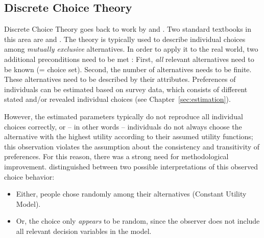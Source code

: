 \subsection{Discrete Choice Theory}
\label{ch:economicEval:describingBehavior:discreteChoice}
%
%

\label{ch:economicEval:describingBehavior:discreteChoice:foundations}
%


Discrete Choice Theory goes back to work by \citet{Luce1965PreferenceUtility} and \citet{McFadden1975DiscreteChoiceModel}. Two standard textbooks in this area are \citet{BenAkivaLerman_1985} and \citet{Train2003discreteChoiceBook}. The theory is typically used to describe individual choices among \emph{mutually exclusive} alternatives. In order to apply it to the real world, two additional preconditions need to be met \citep[p.16]{Train2003discreteChoiceBook}:
%
First, \emph{all} relevant alternatives need to be known (= choice set).
%
Second, the number of alternatives needs to be finite.
%
These alternatives need to be described by their attributes.
%
Preferences of individuals can be estimated based on survey data, which consists of different stated and/or revealed individual choices (see Chapter~\ref{sec:estimation}).
%

However, the estimated parameters typically do not reproduce all individual choices correctly, or -- in other words -- individuals do not always choose the alternative with the highest utility according to their assumed utility functions; this observation violates the assumption about the consistency and transitivity of preferences. For this reason, there was a strong need for methodological improvement.
%
\citet{Luce1965PreferenceUtility} distinguished between two possible interpretations of this observed choice behavior:
%
\begin{itemize}\styleItemize
\item Either, people chose randomly among their alternatives (Constant Utility Model).
%
\item Or, the choice only \emph{appears} to be random, since the observer does not include all relevant decision variables in the model.
\end{itemize}
%

